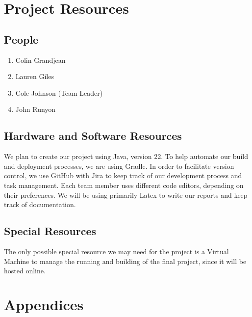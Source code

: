 \documentclass[english,12pt]{article}
\begin{document}
\section{Project Resources}

\subsection{People}
\begin{enumerate}
  \item Colin Grandjean 
  \item Lauren Giles   
  \item Cole Johnson (Team Leader)
  \item John Runyon    
\end{enumerate}
\subsection{Hardware and Software Resources}
We plan to create our project using Java, version 22. 
To help automate our build and deployment processes, we are using Gradle. 
In order to facilitate version control, we use GitHub with Jira to keep track of our 
development process and task management. Each team member uses different 
code editors, depending on their preferences. We will be using primarily Latex to
write our reports and keep track of documentation.

\subsection{Special Resources}
The only possible special resource we may need for the project is a Virtual Machine 
to manage the running and building of the final project, since it will be hosted online.

\section{Appendices}
\end{document}
